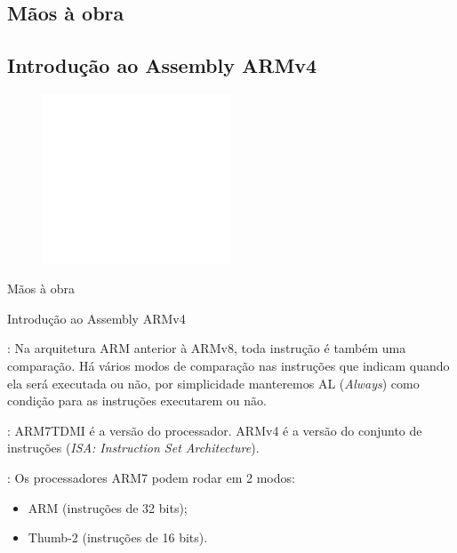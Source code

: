 \documentclass{beamer}
\let\emph\relax %
\begin{document}
\begin{darkframes}
    \section{Mãos à obra}
    \subsection{Introdução ao Assembly ARMv4}
    \begin{frame}
        \begin{center}
            \begin{figure}[h!]
                \centering
                \includegraphics[width=0.5\textwidth,height=0.5\textheight,keepaspectratio]{pencil}
            \end{figure}
            \huge Mãos à obra

            \normalsize Introdução ao Assembly ARMv4
        \end{center}
    \end{frame}

    \begin{frame}{\secname: \subsecname}
        Na arquitetura ARM anterior à ARMv8, toda instrução é também uma
        comparação. Há vários modos de comparação nas instruções que indicam
        quando ela será executada ou não, por simplicidade manteremos AL
        (\textit{Always}) como condição para as instruções executarem ou não.


        \emph{OBS}: ARM7TDMI é a versão do processador. ARMv4 é a versão do
        conjunto de instruções (\textit{ISA: Instruction Set Architecture}).
    \end{frame}

    \begin{frame}{\secname: \subsecname}
        Os processadores ARM7 podem rodar em 2 modos:
        \begin{itemize}
            \item ARM (instruções de 32 bits);
            \item Thumb-2 (instruções de 16 bits).
        \end{itemize}



\end{frame}
\end{darkframes}
\end{document}
